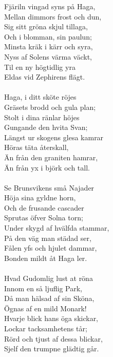 \vspace{10pt}
Fjäriln vingad syns på Haga,\\
Mellan dimmors frost och dun,\\
Sig sitt gröna skjul tillaga,\\
Och i blomman, sin paulun;\\
Minsta kräk i kärr och syra,\\
Nyss af Solens värma väckt,\\
Til en ny högtidlig yra\\
Eldas vid Zephirens flägt.\\
\\

Haga, i ditt sköte röjes\\
Gräsets brodd och gula plan;\\
Stolt i dina ränlar höjes\\
Gungande den hvita Svan;\\
Längst ur skogens glesa kamrar\\
Höras täta återskall,\\
Än från den graniten hamrar,\\
Än från yx i björk och tall.\\
\\

Se Brunsvikens små Najader\\
Höja sina gyldne horn,\\
Och de frusande cascader\\
Sprutas öfver Solna torn;\\
Under skygd af hvälfda stammar,\\
På den väg man städad ser,\\
Fålen yfs och hjulet dammar,\\
Bonden mildt åt Haga ler.\\
\\

Hvad Gudomlig lust at röna\\
Innom en så ljuflig Park,\\
Då man hälsad af sin Sköna,\\
Ögnas af en mild Monark!\\
Hvarje blick hans öga skickar,\\
Lockar tacksamhetens tår;\\
Rörd och tjust af dessa blickar,\\
Sjelf den trumpne glädtig går.\\
